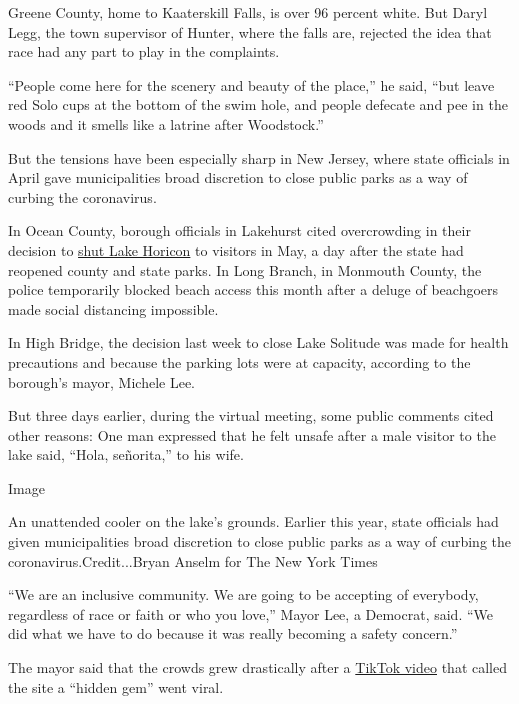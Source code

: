 Greene County, home to Kaaterskill Falls, is over 96 percent white. But
Daryl Legg, the town supervisor of Hunter, where the falls are, rejected
the idea that race had any part to play in the complaints.

``People come here for the scenery and beauty of the place,'' he said,
``but leave red Solo cups at the bottom of the swim hole, and people
defecate and pee in the woods and it smells like a latrine after
Woodstock.''

But the tensions have been especially sharp in New Jersey, where state
officials in April gave municipalities broad discretion to close public
parks as a way of curbing the coronavirus.

In Ocean County, borough officials in Lakehurst cited overcrowding in
their decision to
\href{https://nj1015.com/lake-in-nj-closes-after-one-day-over-crowds-not-social-distancing/}{shut
Lake Horicon} to visitors in May, a day after the state had reopened
county and state parks. In Long Branch, in Monmouth County, the police
temporarily blocked beach access this month after a deluge of beachgoers
made social distancing impossible.

In High Bridge, the decision last week to close Lake Solitude was made
for health precautions and because the parking lots were at capacity,
according to the borough's mayor, Michele Lee.

But three days earlier, during the virtual meeting, some public comments
cited other reasons: One man expressed that he felt unsafe after a male
visitor to the lake said, ``Hola, señorita,'' to his wife.

Image

An unattended cooler on the lake's grounds. Earlier this year, state
officials had given municipalities broad discretion to close public
parks as a way of curbing the coronavirus.Credit...Bryan Anselm for The
New York Times

``We are an inclusive community. We are going to be accepting of
everybody, regardless of race or faith or who you love,'' Mayor Lee, a
Democrat, said. ``We did what we have to do because it was really
becoming a safety concern.''

The mayor said that the crowds grew drastically after a
\href{https://www.tiktok.com/@dkaur171/video/6845337773726043398}{TikTok
video} that called the site a ``hidden gem'' went viral.

\href{https://www.nytimes3xbfgragh.onion/news-event/coronavirus?action=click\&pgtype=Article\&state=default\&region=MAIN_CONTENT_3\&context=storylines_faq}{}

